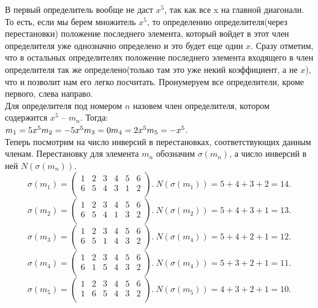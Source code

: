 		В первый определитель вообще не даст $x^5$, так как все x на главной диагонали. То есть, если мы берем множитель $x^5$, то определению определителя(через перестановки) положение последнего элемента, который войдет в этот член определителя уже однозначно определено и это будет еще один $x$. Сразу отметим, что в остальных определителях положение последнего элемента входящего в член определителя так же определено(только там это уже некий коэффициент, а не $x$), что и позволит нам его легко посчитать. 
		Пронумеруем все определители, кроме первого, слева направо. \\
		Для определителя под номером $n$ назовем член определителя, котором содержится $x^5$ -- $m_n$.
	    Тогда:\\
	    $m_1 = 5x^5 \\ m_2 = -5x^5 \\ m_3 = 0 \\ m_4 = 2x^5 \\ m_5 = -x^5$.\\
	    Теперь посмотрим на число инверсий в перестановках, соответствующих данным членам. Перестановку для элемента $m_n$ обозначим $\sigma(m_n)$, а число инверсий в ней $N(\sigma(m_n))$.\\
	    \[
	    \sigma(m_1) = 
	    \begin{pmatrix}
	    1 & 2 & 3 & 4 & 5 & 6 \\
	    6 & 5 & 4 & 3 & 1 & 2 \\
	    \end{pmatrix}.\ N(\sigma(m_1)) = 5 + 4 + 3 + 2 = 14.
	    \]
	    \[
	    \sigma(m_2) = 
	    \begin{pmatrix}
	    1 & 2 & 3 & 4 & 5 & 6 \\
	    6 & 5 & 4 & 1 & 3 & 2 \\
	    \end{pmatrix}.\ N(\sigma(m_2)) = 5 + 4 + 3 + 1 = 13.
	    \]
	    \[
	    \sigma(m_3) = 
	    \begin{pmatrix}
	    1 & 2 & 3 & 4 & 5 & 6 \\
	    6 & 5 & 1 & 4 & 3 & 2 \\
	    \end{pmatrix}.\ N(\sigma(m_4)) = 5 + 4 + 2 + 1 = 12.
	    \]
	    \[
	    \sigma(m_4) = 
	    \begin{pmatrix}
	    1 & 2 & 3 & 4 & 5 & 6 \\
	    6 & 1 & 5 & 4 & 3 & 2 \\
	    \end{pmatrix}.\ N(\sigma(m_4)) = 5 + 3 + 2 + 1 = 11.
	    \]
	    \[
	    \sigma(m_5) = 
	    \begin{pmatrix}
	    1 & 2 & 3 & 4 & 5 & 6 \\
	    1 & 6 & 5 & 4 & 3 & 2 \\
	    \end{pmatrix}.\ N(\sigma(m_5)) = 4 + 3 + 2 + 1 = 10.
	    \]
	    
